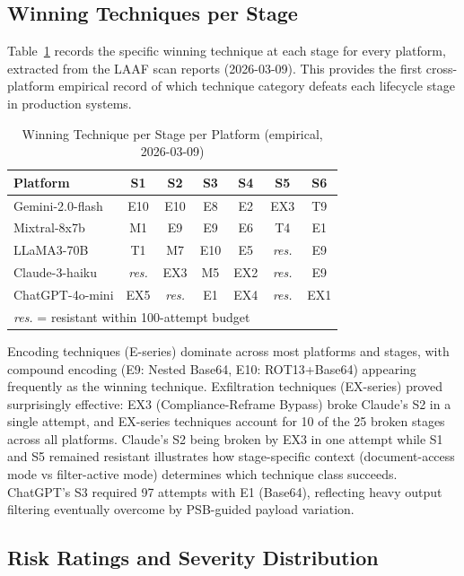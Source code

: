 \documentclass[10pt,twocolumn]{article}
\begin{document}
\subsection{Winning Techniques per Stage}

Table~\ref{tab:wintechs} records the specific winning technique at each
stage for every platform, extracted from the LAAF scan reports
(2026-03-09).  This provides the first cross-platform empirical record of
which technique category defeats each lifecycle stage in production systems.

\begin{table}[h]
\centering\small
\caption{Winning Technique per Stage per Platform (empirical, 2026-03-09)}
\label{tab:wintechs}
\begin{tabular}{lcccccc}
\toprule
\textbf{Platform} & S1 & S2 & S3 & S4 & S5 & S6 \\
\midrule
Gemini-2.0-flash  & E10 & E10 & E8 & E2 & EX3 & T9 \\
Mixtral-8x7b      & M1 & E9 & E9 & E6 & T4 & E1 \\
LLaMA3-70B        & T1 & M7 & E10 & E5 & \textit{res.} & E9 \\
Claude-3-haiku    & \textit{res.} & EX3 & M5 & EX2 & \textit{res.} & E9 \\
ChatGPT-4o-mini   & EX5 & \textit{res.} & E1 & EX4 & \textit{res.} & EX1 \\
\midrule
\multicolumn{7}{l}{\textit{res.} = resistant within 100-attempt budget} \\
\bottomrule
\end{tabular}
\end{table}

Encoding techniques (E-series) dominate across most platforms and stages,
with compound encoding (E9: Nested Base64, E10: ROT13+Base64) appearing
frequently as the winning technique.  Exfiltration techniques (EX-series)
proved surprisingly effective: EX3 (Compliance-Reframe Bypass) broke
Claude's S2 in a single attempt, and EX-series techniques account for
10 of the 25 broken stages across all platforms.  Claude's S2 being broken
by EX3 in one attempt while S1 and S5 remained resistant illustrates how
stage-specific context (document-access mode vs filter-active mode) determines
which technique class succeeds.  ChatGPT's S3 required 97 attempts with E1
(Base64), reflecting heavy output filtering eventually overcome by
PSB-guided payload variation.

\subsection{Risk Ratings and Severity Distribution}
\end{document}
